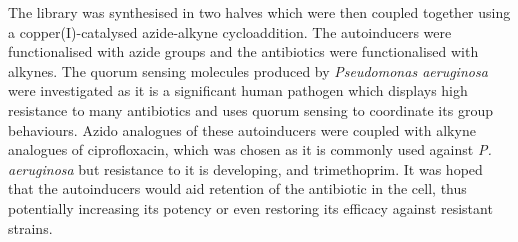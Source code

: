 The library was synthesised in two halves which were then coupled together using a copper(I)-catalysed azide-alkyne cycloaddition\cite{Tornoe2002,Rostovtsev2002}. The autoinducers were functionalised with azide groups and the antibiotics were functionalised with alkynes. The quorum sensing molecules produced by \textit{Pseudomonas aeruginosa} were investigated as it is a significant human pathogen\cite{Bodey1983} which displays high resistance to many antibiotics\cite{Poole2004} and uses quorum sensing to coordinate its group behaviours\cite{Dubern2008}. Azido analogues of these autoinducers were coupled with alkyne analogues of ciprofloxacin, which was chosen as it is commonly used against \textit{P. aeruginosa}\cite{Macgowan1999} but resistance to it is developing\cite{Su2010}, and trimethoprim. It was hoped that the autoinducers would aid retention of the antibiotic in the cell, thus potentially increasing its potency or even restoring its efficacy against resistant strains.

\newpage